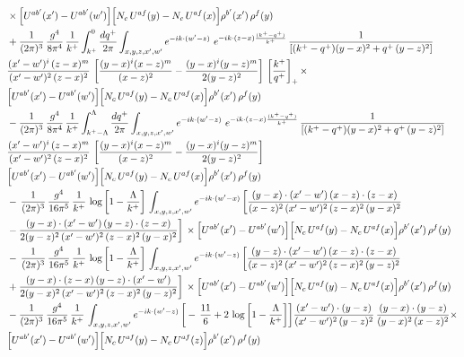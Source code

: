 \documentclass[9pt]{article}
\numberwithin{equation}{section}
\begin{document}
\begin{align}
&\times\Big[U^{ab'}(x')-U^{ab'}(w')\Big]\Big[N_{c}\,U^{af}(y)-N_{c}\,U^{af}(x)\Big]\rho^{b'}(x')\,\rho^{f}(y)\notag \\ & + \frac{1}{(2\pi)^{3}}\,\frac{g^{4}}{8\pi^{4}}\,\frac{1}{k^{+}}\int_{k^{+}}^{0}\frac{dq^{+}}{2\pi}\int_{x,y,z,x',w'}e^{-ik\cdot(w'-z)}\ e^{-ik\cdot(z-x)\frac{(k^{+}-q^{+})}{k^{+}}}\,\frac{1}{\left[(k^{+}-q^{+})(y-x)^{2}+q^{+}\,(y-z)^{2}\right]}\notag \\ & \frac{(x'-w')^{i}\,(z-x)^{m}}{(x'-w')^{2}\,(z-x)^{2}}\,\left[\frac{(y-x)^{i}(x-z)^{m}}{(x-z)^{2}}-\frac{(y-x)^{i}(y-z)^{m}}{2(y-z)^{2}}\right]\,\left[\frac{k^{+}}{q^{+}}\right]_{+}\times\notag \\ & \Big[U^{ab'}(x')-U^{ab'}(w')\Big]\Big[N_{c}\,U^{af}(y)-N_{c}\,U^{af}(x)\Big]\rho^{b'}(x')\,\rho^{f}(y)\notag \\ & - \frac{1}{(2\pi)^{3}}\,\frac{g^{4}}{8\pi^{4}}\,\frac{1}{k^{+}}\int_{k^{+}-\Lambda}^{\Lambda}\frac{dq^{+}}{2\pi}\int_{x,y,z,x',w'}e^{-ik\cdot(w'-z)}\ e^{-ik\cdot(z-x)\frac{(k^{+}-q^{+})}{k^{+}}}\,\frac{1}{\left[(k^{+}-q^{+})(y-x)^{2}+q^{+}\,(y-z)^{2}\right]}\notag \\ & \frac{(x'-w')^{i}\,(z-x)^{m}}{(x'-w')^{2}\,(z-x)^{2}}\,\left[\frac{(y-x)^{i}(x-z)^{m}}{(x-z)^{2}}-\frac{(y-x)^{i}(y-z)^{m}}{2(y-z)^{2}}\right]\notag \\ & \Big[U^{ab'}(x')-U^{ab'}(w')\Big]\Big[N_{c}\,U^{af}(y)-N_{c}\,U^{af}(x)\Big]\rho^{b'}(x')\,\rho^{f}(y)\notag \\ & -\, \frac{1}{(2\pi)^{3}}\,\frac{g^{4}}{16\pi^{5}}\,\frac{1}{k^{+}}\, \log{\left[1-\frac{\Lambda}{k^{+}}\right]}\,\int_{x,y,z,x',w'}e^{-ik\cdot(w'-x)}\, \bigg[\frac{(y-x)\cdot (x'-w')\,(x-z)\cdot (z-x)}{(x-z)^{2}\,(x'-w')^{2}\,(z-x)^{2}\,(y-x)^{2}}\notag \\ & -\frac{(y-x)\cdot (x'-w')\,(y-z)\cdot (z-x)}{2(y-z)^{2}\,(x'-w')^{2}\,(z-x)^{2}\,(y-x)^{2}}\bigg]\,\times \Big[U^{ab'}(x')-U^{ab'}(w')\Big]\Big[N_{c}\,U^{af}(y)-N_{c}\,U^{af}(x)\Big]\rho^{b'}(x')\,\rho^{f}(y)\notag \\ & -\, \frac{1}{(2\pi)^{3}}\,\frac{g^{4}}{16\pi^{5}}\,\frac{1}{k^{+}}\,\log{\left[1-\frac{\Lambda}{k^{+}}\right]}\,\int_{x,y,z,x',w'}e^{-ik\cdot(w'-z)}\,\bigg[\frac{(y-z)\cdot (x'-w')\,(x-z)\cdot (z-x)}{(x-z)^{2}\,(x'-w')^{2}\,(z-x)^{2}\,(y-z)^{2}}\notag \\ & +\frac{(y-x)\cdot (z-x)\,(y-z)\cdot (x'-w')}{2(y-x)^{2}\,(x'-w')^{2}\,(z-x)^{2}\,(y-z)^{2}}\bigg]\,\times \Big[U^{ab'}(x')-U^{ab'}(w')\Big]\Big[N_{c}\,U^{af}(y)-N_{c}\,U^{af}(x)\Big]\rho^{b'}(x')\,\rho^{f}(y)\notag \\ & - \frac{1}{(2\pi)^{3}}\,\frac{g^{4}}{16\pi^{5}}\,\frac{1}{k^{+}}\,\int_{x,y,z,x',w'}e^{-ik\cdot(w'-z)}\,\bigg[-\,\frac{11}{6}+2\, \log{\left[1-\frac{\Lambda}{k^{+}}\right]}\bigg] \frac{(x'-w')\cdot(y-z)}{(x'-w')^{2}\,(y-z)^{2}}\,\frac{(y-x)\cdot(y-z)}{(y-x)^{2}\,(x-z)^{2}}\times\notag \\ & \Big[U^{ab'}(x')-U^{ab'}(w')\Big]\Big[N_{c}\,U^{af}(y)-N_{c}\,U^{af}(z)\Big]\rho^{b'}(x')\,\rho^{f}(y)
\end{align}
\end{document}
